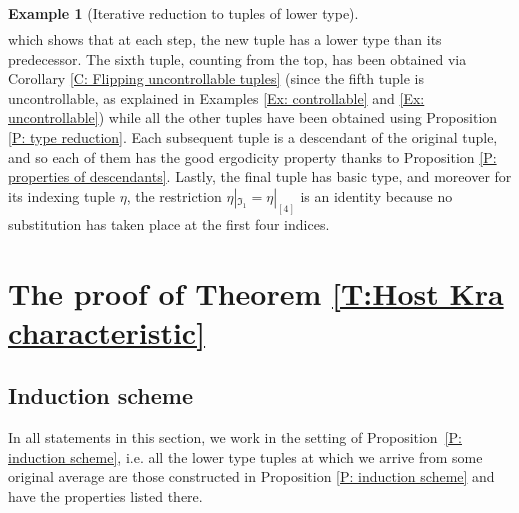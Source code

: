\documentclass[11pt]{amsart}
\theoremstyle{definition}
\newtheorem{example}{Example}
\newcommand{\FI}{{\mathfrak I}}
\begin{document}
\begin{example}[Iterative reduction to tuples of lower type]
\begin{align*}
\end{align*}
which shows that at each step, the new tuple has a lower type than its predecessor. The sixth tuple, counting from the top, has been obtained via Corollary \ref{C: Flipping uncontrollable tuples} (since the fifth tuple is uncontrollable, as explained in Examples \ref{Ex: controllable} and \ref{Ex: uncontrollable}) while all the other tuples have been obtained using Proposition \ref{P: type reduction}. Each subsequent tuple is a descendant of the original tuple, and so each of them has the good ergodicity property thanks to Proposition \ref{P: properties of descendants}. Lastly, the final tuple has basic type, and moreover for its indexing tuple $\eta$, the restriction $\eta|_{\FI_1}=\eta|_{[4]}$ is an identity because no substitution has taken place at the first four indices.
\end{example}







\section{The proof of Theorem \ref{T:Host Kra characteristic}}\label{S:smoothing}
\subsection{Induction scheme}

In all statements in this section, we work in the setting of Proposition~\ref{P: induction scheme}, i.e. all the lower type tuples at which we arrive from some original average are those constructed in Proposition \ref{P: induction scheme} and have the properties listed there.
\end{document}

